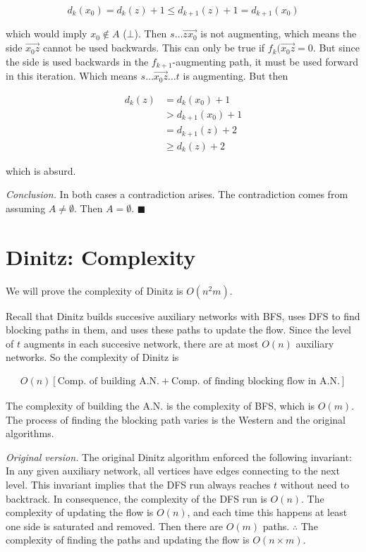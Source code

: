 \documentclass[a4paper]{article}
\begin{document}
$$
d_k(x_0) = d_k(z) + 1 \leq d_{k+1}(z) + 1 = d_{k+1}(x_0) 
$$

which would imply $x_0 \not\in A$ ($\bot$). Then $s \ldots \overrightarrow{zx_0}$ is 
not augmenting, which means the side $\overrightarrow{x_0z}$ cannot 
be used backwards. This can only be true if $f_k(\overrightarrow{x_0z} = 0$.
But since the side is used backwards in the $f_{k+1}$-augmenting path,
it must be used forward in this iteration. Which means $s \ldots \overrightarrow{x_0z} \ldots t$
is augmenting. But then 

\begin{align*}
    d_{k}(z) &= d_{k}(x_0) + 1 \\ 
             &> d_{k+1}(x_0) + 1 \\ 
             &= d_{k+1}(z) +2 \\ 
             &\geq d_{k}(z) + 2 
\end{align*}

which is absurd.

\textit{Conclusion.} In both cases a contradiction arises. The contradiction
comes from assuming $A \neq \emptyset$. Then $A = \emptyset$. $\blacksquare$


\pagebreak

\section{Dinitz: Complexity}


We will prove the complexity of Dinitz is $O(n^2m)$. 

Recall that Dinitz builds succesive auxiliary networks with BFS, uses DFS to find blocking 
paths in them, and uses these paths to update the flow. Since the level 
of $t$ augments in each succesive network, there are at most $O(n)$ auxiliary 
networks. So the complexity of Dinitz is 

\begin{align*}
    O(n) \left[ \text{Comp. of building A.N.} + \text{Comp. of finding blocking flow in A.N.} \right] 
\end{align*}

The complexity of building the A.N. is the complexity of BFS,  which is $O(m)$.
The process of finding the blocking path varies is the Western and the original
algorithms. 

\textit{Original version.} The original Dinitz algorithm enforced the following
invariant: In any given auxiliary network, all vertices have edges connecting
to the next level. This invariant implies that the DFS run always reaches $t$
without need to backtrack. In consequence, the complexity of the DFS run is
$O(n)$. The complexity of updating the flow is $O(n)$, and each time this happens 
at least one side is saturated and removed. Then there are $O(m)$ paths.
$\therefore $ The complexity of finding the paths and updating the flow
is $O(n \times m)$.
\end{document}

